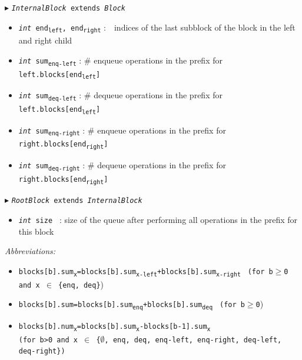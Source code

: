 \documentclass[10pt]{article}
\newcommand{\sub}[1]{\textsubscript{#1}}
\renewcommand{\tt}[1]{\texttt{#1}}
\renewcommand{\sl}[1]{\textsl{#1}}
\renewcommand{\it}[1]{\textit{#1}}
\newcommand{\size}{size }
\theoremstyle{definition}
\begin{document}
\begin{algorithm}
\begin{algorithmic}[1]
\begin{multicols}{2}
\begin{itemize}
\end{itemize}

\pagebreak

\Statex $\blacktriangleright$ \tt{\sl{InternalBlock} extends \sl{Block}}
\begin{itemize}
    \item \tt{\sl{int} end\sub{left}, end\sub{right}}
  \textsf{:~~indices of the last subblock of the block in the left and right child}
  \item \tt{\sl{int} sum\sub{enq-left}}
  \textsf{: \# enqueue operations in the prefix for \tt{left.blocks[end\sub{left}]}}
  \item \tt{\sl{int} sum\sub{deq-left}}
  \textsf{: \# dequeue operations in the prefix for \tt{left.blocks[end\sub{left}]}}
  \item \tt{\sl{int} sum\sub{enq-right}}
  \textsf{: \# enqueue operations in the prefix for \tt{right.blocks[end\sub{right}]}}
  \item \tt{\sl{int} sum\sub{deq-right}}
  \textsf{: \# dequeue operations in the prefix for \tt{right.blocks[end\sub{right}]}}
\end{itemize}


\Statex $\blacktriangleright$ \tt{\sl{RootBlock} extends \sl{InternalBlock}}
\begin{itemize}
  \item \tt{\sl{int} \size}
  \textsf{: size of the queue after performing all operations in the prefix for this block}
\end{itemize}

\end{multicols}
\end{algorithmic}
\end{algorithm}

\begin{footnotesize}

\it{Abbreviations:}
\begin{itemize}
 \item \tt{blocks[b].sum\sub{x}=blocks[b].sum\sub{x-left}+blocks[b].sum\sub{x-right}}  \tt{ (for b$\geq$0 and x $\in$ \{enq, deq\}})
 \item \tt{blocks[b].sum=blocks[b].sum\sub{enq}+blocks[b].sum\sub{deq}}  \tt{ (for b$\geq$0})
  \item \tt{blocks[b].num\sub{x}=blocks[b].sum\sub{x}-blocks[b-1].sum\sub{x}} \\ \tt{(for b>0 and x $\in$ \{$\emptyset$, enq, deq, enq-left, enq-right, deq-left, deq-right\})}
\end{itemize}
\end{footnotesize}
\end{document}
